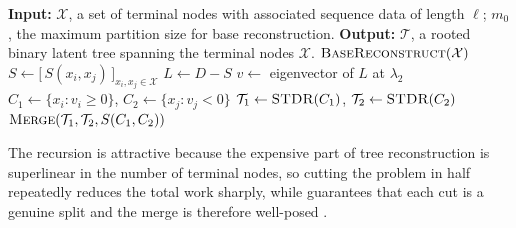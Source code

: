 \begin{algorithm}[t]
\caption{Spectral Top-Down Reconstruction (STDR) for Latent Tree Models. The algorithm recursively partitions terminal nodes using the Fiedler vector of the similarity graph until the subset size falls below $m_0$. A base method recovers the small subtrees, which are then deterministically merged by identifying optimal placeholder edges via singular vectors of the cross-similarity matrix \cite{aizenbud2023spectral}.}


\label{alg:stdr}
\begin{algorithmic}[1]
\State \textbf{Input:} $\mathcal{X}$, a set of terminal nodes with associated sequence data of length $\ell$; $m_0$, the maximum partition size for base reconstruction.
\State \textbf{Output:} $\mathcal{T}$, a rooted binary latent tree spanning the terminal nodes $\mathcal{X}$.
    \State \Return $\textsc{BaseReconstruct}(\mathcal{X})$
  \EndIf
  \State $S \gets \bigl[\,S(x_i,x_j)\,\bigr]_{x_i,x_j \in \mathcal{X}}$
  \State $L \gets D - S$ 
  \State $v \gets$ eigenvector of $L$ at $\lambda_2$ 
  \State $C_1 \gets \{x_i : v_i \ge 0\}$, \quad $C_2 \gets \{x_j : v_j < 0\}$
  \State $\mathcal{T}_1 \gets \textsc{STDR}(C_1)$, \quad
         $\mathcal{T}_2 \gets \textsc{STDR}(C_2)$
  \State \Return $\textsc{Merge}(\mathcal{T}_1, \mathcal{T}_2, S(C_1, C_2))$
\EndProcedure
\end{algorithmic}
\end{algorithm}

The recursion is attractive because the expensive part of tree reconstruction is superlinear in the
number of terminal nodes, so cutting the problem in half repeatedly reduces the total work sharply,
while  guarantees that each cut is a genuine split and the merge is therefore
well-posed \cite{aizenbud2023spectral}.